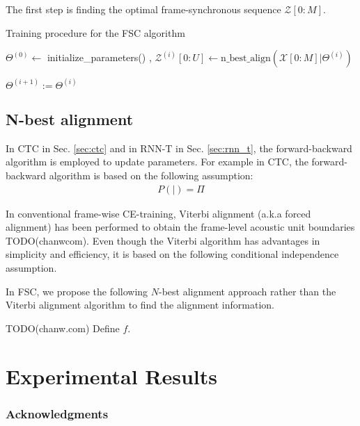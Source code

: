 \documentclass{article}
\begin{document}
The first step is finding the optimal frame-synchronous sequence
$\mathcal{Z}[0:M]$.   


\begin{algorithm}
  \caption{Training procedure for the FSC algorithm}
  \label{algo:fsc_training}
  \begin{algorithmic}
    \State $\Theta^{(0)} \leftarrow$ initialize\_parameters()
      , 
        \State $ {{\mathcal{Z}^{(i)}}[0:U]}
          \leftarrow
          \text{n\_best\_align}
          \left(
            \mathcal{X}[0:M] \Big| \Theta^{(i)}
          \right)$


    \EndFor
    \State $\Theta^{(i+1)} := \Theta^{(i)}$
  \EndFor
  \label{algorithm:fsc_training}
  \end{algorithmic}
\end{algorithm}



\subsection{N-best alignment}
\label{sec:n_best_alignment}


In CTC in Sec. \ref{sec:ctc} and in RNN-T in Sec. \ref{sec:rnn_t}, the 
forward-backward algorithm is employed to update parameters. 
For example in CTC, the forward-backward algorithm is based on the
following assumption:
\begin{align}
  P \left(  \Big| \right) = \Pi
\end{align}

In conventional frame-wise CE-training, Viterbi alignment 
(a.k.a forced alignment) has been performed to obtain the frame-level 
acoustic unit  boundaries TODO(chanwcom). Even though the Viterbi algorithm
has advantages in simplicity and efficiency, it is based on
the following conditional independence assumption.

In FSC, we propose the following $N$-best alignment approach rather than
the Viterbi alignment algorithm to find the alignment information.

TODO(chanw.com) Define $f$.

\section{Experimental Results}
\label{sec:experimental_results}


\subsubsection*{Acknowledgments}



\small

\clearpage
\newpage


\end{document}
